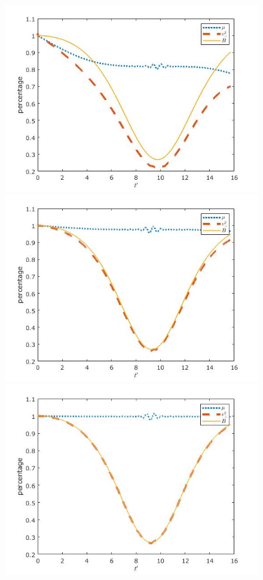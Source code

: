 \documentclass{article}
\begin{document}
\begin{enumerate}
\begin{enumerate}
\begin{figure}[h]
\centering
\vbox{
\includegraphics[scale=0.29]{problem4a/magnetic_5000.jpg}
\includegraphics[scale=0.29]{problem4a/magnetic_10000.jpg}
}
\vbox{
\includegraphics[scale=0.29]{problem4a/magnetic_20000.jpg}
}
\end{figure}
\end{enumerate}
\end{enumerate}
\end{document}
